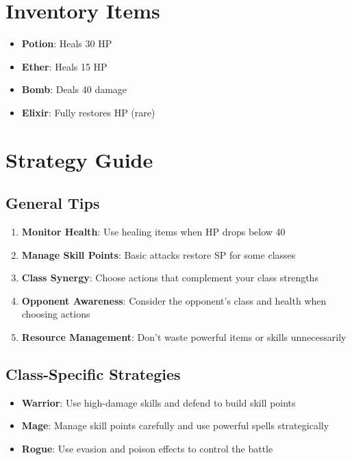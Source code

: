\documentclass[12pt]{article}
\begin{document}
\section{Inventory Items}
\label{sec:inventory}

\begin{itemize}
    \item \textbf{Potion}: Heals 30 HP
    \item \textbf{Ether}: Heals 15 HP
    \item \textbf{Bomb}: Deals 40 damage
    \item \textbf{Elixir}: Fully restores HP (rare)
\end{itemize}

\section{Strategy Guide}
\label{sec:strategy}

\subsection{General Tips}
\begin{enumerate}
    \item \textbf{Monitor Health}: Use healing items when HP drops below 40
    \item \textbf{Manage Skill Points}: Basic attacks restore SP for some classes
    \item \textbf{Class Synergy}: Choose actions that complement your class strengths
    \item \textbf{Opponent Awareness}: Consider the opponent's class and health when choosing actions
    \item \textbf{Resource Management}: Don't waste powerful items or skills unnecessarily
\end{enumerate}

\subsection{Class-Specific Strategies}
\begin{itemize}
    \item \textbf{Warrior}: Use high-damage skills and defend to build skill points
    \item \textbf{Mage}: Manage skill points carefully and use powerful spells strategically
    \item \textbf{Rogue}: Use evasion and poison effects to control the battle
\end{itemize}
\end{document}
